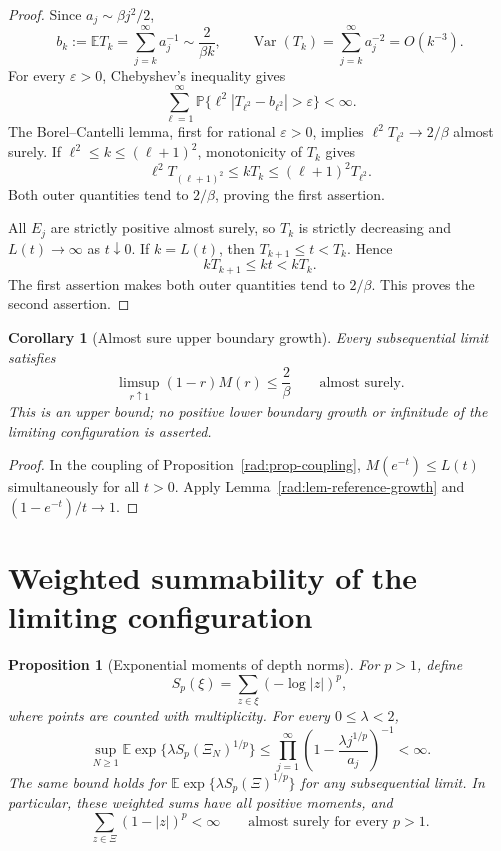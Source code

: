 \documentclass[11pt,a4paper]{article}
\numberwithin{equation}{section}
\newtheorem{proposition}[theorem]{Proposition}
\newtheorem{corollary}[theorem]{Corollary}
\theoremstyle{definition}
\theoremstyle{remark}
\newcommand{\E}{\mathbb E}
\newcommand{\Pbb}{\mathbb P}
\begin{document}
\begin{proof}
Since $a_j\sim\beta j^2/2$,
\[
 b_k:=\E T_k=\sum_{j=k}^{\infty}a_j^{-1}
       \sim\frac{2}{\beta k},\qquad
 \operatorname{Var}(T_k)=\sum_{j=k}^{\infty}a_j^{-2}=O(k^{-3}).
\]
For every $\varepsilon>0$, Chebyshev's inequality gives
\[
 \sum_{\ell=1}^{\infty}
 \Pbb\{\ell^2|T_{\ell^2}-b_{\ell^2}|>\varepsilon\}<\infty.
\]
The Borel--Cantelli lemma, first for rational $\varepsilon>0$, implies
$\ell^2T_{\ell^2}\to2/\beta$ almost surely.  If
$\ell^2\leq k\leq(\ell+1)^2$, monotonicity of $T_k$ gives
\[
 \ell^2 T_{(\ell+1)^2}\leq kT_k
 \leq(\ell+1)^2T_{\ell^2}.
\]
Both outer quantities tend to $2/\beta$, proving the first assertion.

All $E_j$ are strictly positive almost surely, so $T_k$ is strictly
decreasing and $L(t)\to\infty$ as $t\downarrow0$.  If $k=L(t)$, then
$T_{k+1}\leq t<T_k$.  Hence
\[
 kT_{k+1}\leq kt<kT_k.
\]
The first assertion makes both outer quantities tend to $2/\beta$.
This proves the second assertion.
\end{proof}

\begin{corollary}[Almost sure upper boundary growth]
\label{rad:cor-boundary-growth}
Every subsequential limit satisfies
\begin{equation}
 \limsup_{r\uparrow1}(1-r)M(r)\leq\frac{2}{\beta}
 \qquad\text{almost surely}.
 \label{rad:eq-boundary-growth}
\end{equation}
This is an upper bound; no positive lower boundary growth or infinitude
of the limiting configuration is asserted.
\end{corollary}

\begin{proof}
In the coupling of Proposition~\ref{rad:prop-coupling},
$M(e^{-t})\leq L(t)$ simultaneously for all $t>0$.  Apply
Lemma~\ref{rad:lem-reference-growth} and
$(1-e^{-t})/t\to1$.
\end{proof}

\section{Weighted summability of the limiting configuration}
\label{rad:section-weighted}

\begin{proposition}[Exponential moments of depth norms]
\label{rad:prop-depth-moments}
For $p>1$, define
\[
 S_p(\xi)=\sum_{z\in\xi}(-\log|z|)^p,
\]
where points are counted with multiplicity.  For every $0\leq\lambda<2$,
\begin{equation}
 \sup_{N\geq1}\E\exp\{\lambda S_p(\Xi_N)^{1/p}\}
 \leq
 \prod_{j=1}^{\infty}
 \left(1-\frac{\lambda j^{1/p}}{a_j}\right)^{-1}
 <\infty.
 \label{rad:eq-depth-mgf}
\end{equation}
The same bound holds for $\E\exp\{\lambda S_p(\Xi)^{1/p}\}$ for any
subsequential limit.  In particular, these weighted sums have all
positive moments, and
\begin{equation}
 \sum_{z\in\Xi}(1-|z|)^p<\infty
 \qquad\text{almost surely for every }p>1.
 \label{rad:eq-boundary-summability}
\end{equation}
\end{proposition}
\end{document}
